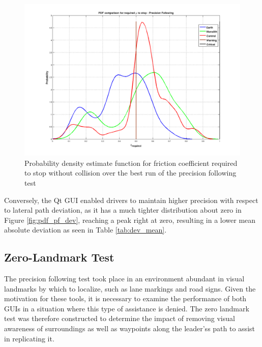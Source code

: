 \documentclass[twocolumn,10pt]{article}
\begin{document}
    \begin{figure}[ht] \centering
      \includegraphics[width=\columnwidth]{../graphics/precision_following_mu_distribution.png}
      \caption{Probability density estimate function for friction coefficient required to stop without collision over the best run of the precision following test}
      \label{fig:pdf_pf_mu}
    \end{figure}

    Conversely, the Qt GUI enabled drivers to maintain higher precision with respect to lateral path deviation, as it has a much tighter distribution about zero in Figure \ref{fig:pdf_pf_dev}, reaching a peak right at zero, resulting in a lower mean absolute deviation as seen in Table \ref{tab:dev_mean}.



  \subsection*{Zero-Landmark Test}

    The precision following test took place in an environment abundant in visual landmarks by which to localize, such as lane markings and road signs.  Given the motivation for these tools, it is necessary to examine the performance of both GUIs in a situation where this type of assistance is denied.  The zero landmark test was therefore constructed to determine the impact of removing visual awareness of surroundings as well as waypoints along the leader'ss path to assist in replicating it.
    
\end{document}
